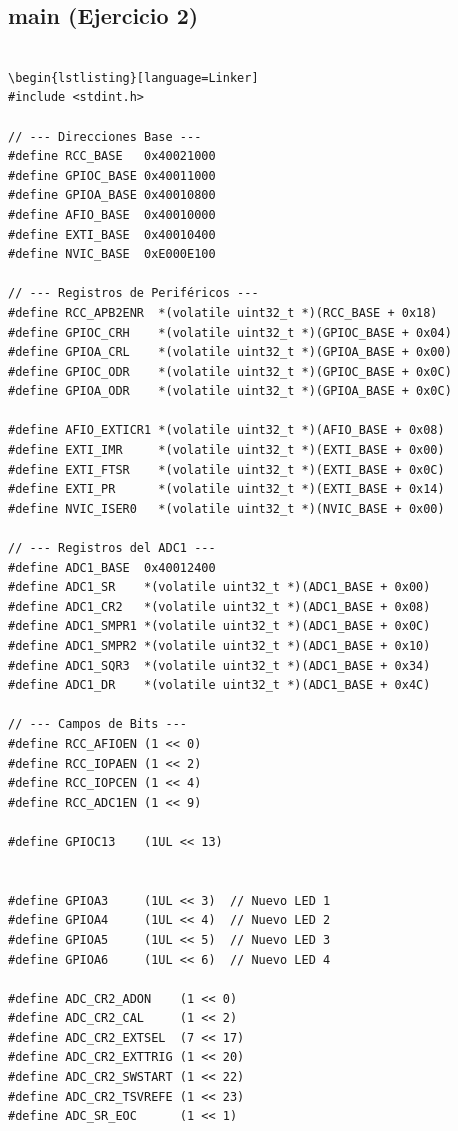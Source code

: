 \subsection{main (Ejercicio 2)}
\begin{lstlisting}[caption={Configuración inicial en main.c}, label={cod:main}]

\begin{lstlisting}[language=Linker]
#include <stdint.h>

// --- Direcciones Base ---
#define RCC_BASE   0x40021000
#define GPIOC_BASE 0x40011000
#define GPIOA_BASE 0x40010800
#define AFIO_BASE  0x40010000
#define EXTI_BASE  0x40010400
#define NVIC_BASE  0xE000E100

// --- Registros de Periféricos ---
#define RCC_APB2ENR  *(volatile uint32_t *)(RCC_BASE + 0x18)
#define GPIOC_CRH    *(volatile uint32_t *)(GPIOC_BASE + 0x04)
#define GPIOA_CRL    *(volatile uint32_t *)(GPIOA_BASE + 0x00)
#define GPIOC_ODR    *(volatile uint32_t *)(GPIOC_BASE + 0x0C)
#define GPIOA_ODR    *(volatile uint32_t *)(GPIOA_BASE + 0x0C)

#define AFIO_EXTICR1 *(volatile uint32_t *)(AFIO_BASE + 0x08)
#define EXTI_IMR     *(volatile uint32_t *)(EXTI_BASE + 0x00)
#define EXTI_FTSR    *(volatile uint32_t *)(EXTI_BASE + 0x0C)
#define EXTI_PR      *(volatile uint32_t *)(EXTI_BASE + 0x14)
#define NVIC_ISER0   *(volatile uint32_t *)(NVIC_BASE + 0x00)

// --- Registros del ADC1 ---
#define ADC1_BASE  0x40012400
#define ADC1_SR    *(volatile uint32_t *)(ADC1_BASE + 0x00)
#define ADC1_CR2   *(volatile uint32_t *)(ADC1_BASE + 0x08)
#define ADC1_SMPR1 *(volatile uint32_t *)(ADC1_BASE + 0x0C)
#define ADC1_SMPR2 *(volatile uint32_t *)(ADC1_BASE + 0x10)
#define ADC1_SQR3  *(volatile uint32_t *)(ADC1_BASE + 0x34)
#define ADC1_DR    *(volatile uint32_t *)(ADC1_BASE + 0x4C)

// --- Campos de Bits ---
#define RCC_AFIOEN (1 << 0)
#define RCC_IOPAEN (1 << 2)
#define RCC_IOPCEN (1 << 4)
#define RCC_ADC1EN (1 << 9)

#define GPIOC13    (1UL << 13)


#define GPIOA3     (1UL << 3)  // Nuevo LED 1
#define GPIOA4     (1UL << 4)  // Nuevo LED 2
#define GPIOA5     (1UL << 5)  // Nuevo LED 3
#define GPIOA6     (1UL << 6)  // Nuevo LED 4

#define ADC_CR2_ADON    (1 << 0)
#define ADC_CR2_CAL     (1 << 2)  
#define ADC_CR2_EXTSEL  (7 << 17) 
#define ADC_CR2_EXTTRIG (1 << 20)
#define ADC_CR2_SWSTART (1 << 22)
#define ADC_CR2_TSVREFE (1 << 23)
#define ADC_SR_EOC      (1 << 1)



\end{lstlisting}

